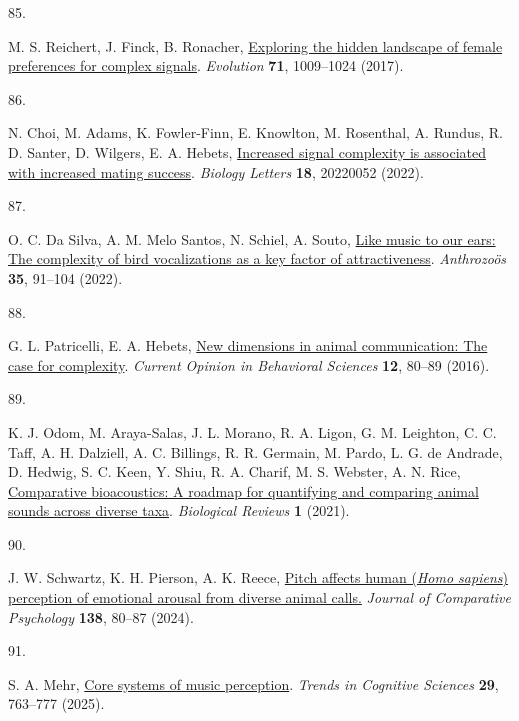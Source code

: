\documentclass[
]{article}
\newlength{\cslhangindent}
\newlength{\csllabelwidth}
\newenvironment{CSLReferences}[2] %
 {\begin{list}{}{%
  \setlength{\itemindent}{0pt}
  \setlength{\leftmargin}{0pt}
  \setlength{\parsep}{0pt}
  \ifodd #1
   \setlength{\leftmargin}{\cslhangindent}
   \setlength{\itemindent}{-1\cslhangindent}
  \fi
  \setlength{\itemsep}{#2\baselineskip}}}
 {\end{list}}
\newcommand{\CSLLeftMargin}[1]{\parbox[t]{\csllabelwidth}{\strut#1\strut}}
\newcommand{\CSLRightInline}[1]{\parbox[t]{\linewidth - \csllabelwidth}{\strut#1\strut}}
\begin{document}
\begin{CSLReferences}{0}{0}
\CSLLeftMargin{85. }%
\CSLRightInline{M. S. Reichert, J. Finck, B. Ronacher,
\href{https://doi.org/10.1111/evo.13202}{Exploring the hidden landscape
of female preferences for complex signals}. \emph{Evolution}
\textbf{71}, 1009--1024 (2017).}

\CSLLeftMargin{86. }%
\CSLRightInline{N. Choi, M. Adams, K. Fowler-Finn, E. Knowlton, M.
Rosenthal, A. Rundus, R. D. Santer, D. Wilgers, E. A. Hebets,
\href{https://doi.org/10.1098/rsbl.2022.0052}{Increased signal
complexity is associated with increased mating success}. \emph{Biology
Letters} \textbf{18}, 20220052 (2022).}

\CSLLeftMargin{87. }%
\CSLRightInline{O. C. Da Silva, A. M. Melo Santos, N. Schiel, A. Souto,
\href{https://doi.org/10.1080/08927936.2021.1963546}{Like music to our
ears: {The} complexity of bird vocalizations as a key factor of
attractiveness}. \emph{Anthrozoös} \textbf{35}, 91--104 (2022).}

\CSLLeftMargin{88. }%
\CSLRightInline{G. L. Patricelli, E. A. Hebets,
\href{https://doi.org/10.1016/j.cobeha.2016.09.011}{New dimensions in
animal communication: The case for complexity}. \emph{Current Opinion in
Behavioral Sciences} \textbf{12}, 80--89 (2016).}

\CSLLeftMargin{89. }%
\CSLRightInline{K. J. Odom, M. Araya-Salas, J. L. Morano, R. A. Ligon,
G. M. Leighton, C. C. Taff, A. H. Dalziell, A. C. Billings, R. R.
Germain, M. Pardo, L. G. de Andrade, D. Hedwig, S. C. Keen, Y. Shiu, R.
A. Charif, M. S. Webster, A. N. Rice,
\href{https://doi.org/10.1111/brv.12695}{Comparative bioacoustics: A
roadmap for quantifying and comparing animal sounds across diverse
taxa}. \emph{Biological Reviews} \textbf{1} (2021).}

\CSLLeftMargin{90. }%
\CSLRightInline{J. W. Schwartz, K. H. Pierson, A. K. Reece,
\href{https://doi.org/10.1037/com0000366}{Pitch affects human
(\emph{{Homo} sapiens}) perception of emotional arousal from diverse
animal calls.} \emph{Journal of Comparative Psychology} \textbf{138},
80--87 (2024).}

\CSLLeftMargin{91. }%
\CSLRightInline{S. A. Mehr,
\href{https://doi.org/10.1016/j.tics.2025.05.013}{Core systems of music
perception}. \emph{Trends in Cognitive Sciences} \textbf{29}, 763--777
(2025).}


\end{CSLReferences}
\end{document}
